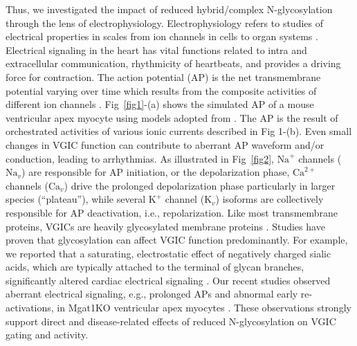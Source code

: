 \documentclass[10pt,letterpaper]{article}
\begin{document}
Thus, we investigated the impact of reduced hybrid/complex N-glycosylation through the lens of electrophysiology. Electrophysiology refers to studies of electrical properties in scales from ion channels in cells to organ systems \cite{scanziani2009electrophysiology}. Electrical signaling in the heart has vital functions related to intra and extracellular communication, rhythmicity of heartbeats, and provides a driving force for contraction. The action potential (AP) is the net transmembrane potential varying over time which results from the composite activities of different ion channels \cite{grant2009cardiac}. Fig~\ref{fig1}-(a) shows the simulated AP of a mouse ventricular apex myocyte using models adopted from \cite{bondarenko2004computer}. The AP is the result of orchestrated activities of various ionic currents described in Fig 1-(b). Even small changes in VGIC function can contribute to aberrant AP waveform and/or conduction, leading to arrhythmias. As illustrated in Fig~\ref{fig2}, $\text{Na}^{+}$ channels ($\text{Na}_{v}$) are responsible for AP initiation, or the depolarization phase, $\text{Ca}^{2+}$ channels ($\text{Ca}_{v}$) drive the prolonged depolarization phase particularly in larger species (“plateau”), while several $\text{K}^{+}$ channel ($\text{K}_{v}$) isoforms are collectively responsible for AP deactivation, i.e., repolarization. Like most transmembrane proteins, VGICs are heavily glycosylated membrane proteins \cite{ednie2011modulation}. Studies have proven that glycosylation can affect VGIC function predominantly. For example, we reported that a saturating, electrostatic effect of negatively charged sialic acids, which are typically attached to the terminal of glycan branches, significantly altered cardiac electrical signaling \cite{ednie2013expression, ednie2015reduced}. Our recent studies observed aberrant electrical signaling, e.g., prolonged APs and abnormal early re-activations, in Mgat1KO ventricular apex myocytes \cite{ednie2019reduced, ednie2019reduced2}. These observations strongly support direct and disease-related effects of reduced N-glycosylation on VGIC gating and activity.
\end{document}
